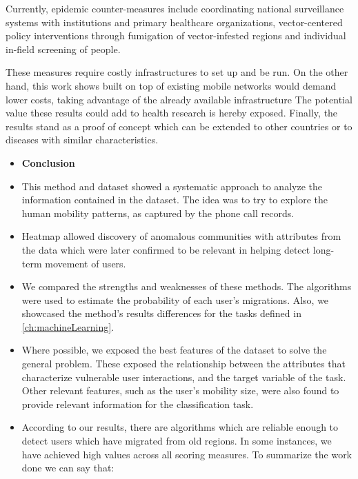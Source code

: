 

Currently, epidemic counter-measures include coordinating national surveillance systems with institutions and primary healthcare organizations, vector-centered policy interventions through fumigation of vector-infested regions and individual in-field screening of people.

These measures require costly infrastructures to set up and be run.
On the other hand, this work shows built on top of existing mobile networks would demand lower costs, taking advantage of the already available infrastructure
The potential value these results could add to health research is hereby exposed.
Finally, the results stand as a proof of concept which can be extended to other countries or to diseases with similar characteristics.


\begin{itemize}

    \item \textbf{Conclusion}

    \item This method and dataset showed a systematic approach to analyze the information contained in the dataset.
    The idea was to try to explore the human mobility patterns, as captured by the phone call records.

    \item Heatmap allowed discovery of anomalous communities with attributes from the data which were later confirmed to be relevant in helping detect long-term movement of users.

    \item We compared the strengths and weaknesses of these methods.
    The algorithms  were used to estimate the probability of each user's migrations.
    Also, we showcased the method's results differences for the tasks defined in \cref{ch:machineLearning}.

    \item Where possible, we exposed the best features of the dataset to solve the general problem.
    These exposed the relationship between the attributes that characterize vulnerable user interactions, and the target variable of the task.
    Other relevant features, such as the user's mobility size, were also found to provide relevant information for the classification task.

    \item According to our results, there are algorithms which are reliable enough to detect users which have migrated from old regions. In some instances, we have achieved high values across all scoring measures. To summarize the work done we can say that:

\end{itemize}



